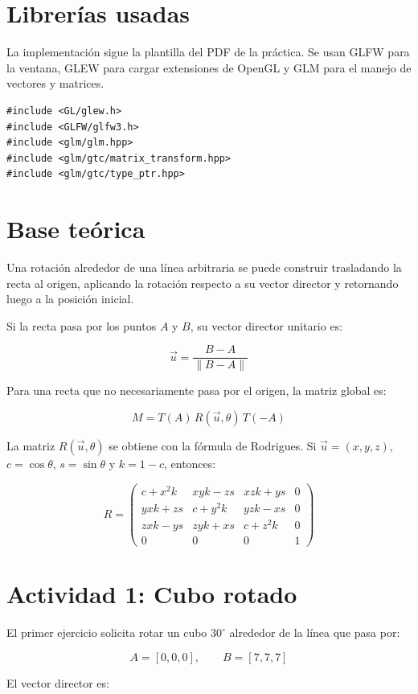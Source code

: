 \documentclass[12pt,a4paper]{article}
\begin{document}
\section*{Librer\'ias usadas}
La implementaci\'on sigue la plantilla del PDF de la pr\'actica. Se usan GLFW para la ventana, GLEW para cargar extensiones de OpenGL y GLM para el manejo de vectores y matrices.

\begin{lstlisting}[style=cxx,caption={Librerias principales usadas en la practica.}]
#include <GL/glew.h>
#include <GLFW/glfw3.h>
#include <glm/glm.hpp>
#include <glm/gtc/matrix_transform.hpp>
#include <glm/gtc/type_ptr.hpp>
\end{lstlisting}

\section*{Base te\'orica}
Una rotaci\'on alrededor de una l\'inea arbitraria se puede construir trasladando la recta al origen, aplicando la rotaci\'on respecto a su vector director y retornando luego a la posici\'on inicial.

Si la recta pasa por los puntos $A$ y $B$, su vector director unitario es:

\[
\vec{u}=\frac{B-A}{\|B-A\|}
\]

Para una recta que no necesariamente pasa por el origen, la matriz global es:

\[
M = T(A)\,R(\vec{u},\theta)\,T(-A)
\]

La matriz $R(\vec{u},\theta)$ se obtiene con la f\'ormula de Rodrigues. Si $\vec{u}=(x,y,z)$, $c=\cos\theta$, $s=\sin\theta$ y $k=1-c$, entonces:

\[
R =
\begin{pmatrix}
c+x^2k & xy k-zs & xz k+ys & 0\\
yx k+zs & c+y^2k & yz k-xs & 0\\
zx k-ys & zy k+xs & c+z^2k & 0\\
0 & 0 & 0 & 1
\end{pmatrix}
\]

\section*{Actividad 1: Cubo rotado}
El primer ejercicio solicita rotar un cubo $30^\circ$ alrededor de la l\'inea que pasa por:

\[
A=[0,0,0], \qquad B=[7,7,7]
\]

El vector director es:
\end{document}
